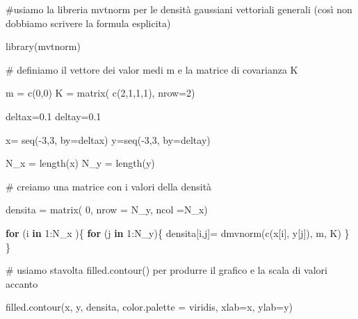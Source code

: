 \documentclass[
  italian,
  letterpaper,
]{book}
\newenvironment{Shaded}{\begin{snugshade}}{\end{snugshade}}
\newcommand{\AttributeTok}[1]{\textcolor[rgb]{0.40,0.45,0.13}{#1}}
\newcommand{\CommentTok}[1]{\textcolor[rgb]{0.37,0.37,0.37}{#1}}
\newcommand{\ControlFlowTok}[1]{\textcolor[rgb]{0.00,0.23,0.31}{\textbf{#1}}}
\newcommand{\DecValTok}[1]{\textcolor[rgb]{0.68,0.00,0.00}{#1}}
\newcommand{\FloatTok}[1]{\textcolor[rgb]{0.68,0.00,0.00}{#1}}
\newcommand{\FunctionTok}[1]{\textcolor[rgb]{0.28,0.35,0.67}{#1}}
\newcommand{\NormalTok}[1]{\textcolor[rgb]{0.00,0.23,0.31}{#1}}
\newcommand{\OtherTok}[1]{\textcolor[rgb]{0.00,0.23,0.31}{#1}}
\newcommand{\SpecialCharTok}[1]{\textcolor[rgb]{0.37,0.37,0.37}{#1}}
\newcommand{\StringTok}[1]{\textcolor[rgb]{0.13,0.47,0.30}{#1}}
\theoremstyle{definition}
\theoremstyle{remark}
\begin{document}
\begin{Shaded}
\begin{Highlighting}[]
\CommentTok{\#usiamo la libreria mvtnorm per le densità gaussiani vettoriali generali (così non dobbiamo scrivere la formula esplicita)}


\FunctionTok{library}\NormalTok{(}\StringTok{\textquotesingle{}mvtnorm\textquotesingle{}}\NormalTok{)}

\CommentTok{\# definiamo il vettore dei valor medi m e la matrice di covarianza K}

\NormalTok{m }\OtherTok{=} \FunctionTok{c}\NormalTok{(}\DecValTok{0}\NormalTok{,}\DecValTok{0}\NormalTok{)}
\NormalTok{K }\OtherTok{=} \FunctionTok{matrix}\NormalTok{( }\FunctionTok{c}\NormalTok{(}\DecValTok{2}\NormalTok{,}\DecValTok{1}\NormalTok{,}\DecValTok{1}\NormalTok{,}\DecValTok{1}\NormalTok{), }\AttributeTok{nrow=}\DecValTok{2}\NormalTok{)}



\NormalTok{deltax}\OtherTok{=}\FloatTok{0.1}
\NormalTok{deltay}\OtherTok{=}\FloatTok{0.1}

\NormalTok{x}\OtherTok{=} \FunctionTok{seq}\NormalTok{(}\SpecialCharTok{{-}}\DecValTok{3}\NormalTok{,}\DecValTok{3}\NormalTok{, }\AttributeTok{by=}\NormalTok{deltax)}
\NormalTok{y}\OtherTok{=}\FunctionTok{seq}\NormalTok{(}\SpecialCharTok{{-}}\DecValTok{3}\NormalTok{,}\DecValTok{3}\NormalTok{, }\AttributeTok{by=}\NormalTok{deltay)}

\NormalTok{N\_x }\OtherTok{=} \FunctionTok{length}\NormalTok{(x)}
\NormalTok{N\_y }\OtherTok{=} \FunctionTok{length}\NormalTok{(y)}


\CommentTok{\# creiamo una matrice con i valori della densità}

\NormalTok{densita }\OtherTok{=} \FunctionTok{matrix}\NormalTok{( }\DecValTok{0}\NormalTok{, }\AttributeTok{nrow =}\NormalTok{ N\_y, }\AttributeTok{ncol =}\NormalTok{N\_x)}

\ControlFlowTok{for}\NormalTok{ (i }\ControlFlowTok{in} \DecValTok{1}\SpecialCharTok{:}\NormalTok{N\_x  )\{}
  \ControlFlowTok{for}\NormalTok{ (j }\ControlFlowTok{in} \DecValTok{1}\SpecialCharTok{:}\NormalTok{N\_y)\{}
\NormalTok{    densita[i,j]}\OtherTok{=} \FunctionTok{dmvnorm}\NormalTok{(}\FunctionTok{c}\NormalTok{(x[i], y[j]), m, K)}
\NormalTok{  \}}
\NormalTok{\}}

\CommentTok{\# usiamo stavolta filled.contour() per produrre il grafico e la scala di valori accanto}

\FunctionTok{filled.contour}\NormalTok{(x, y, densita, }\AttributeTok{color.palette =}\NormalTok{ viridis, }\AttributeTok{xlab=}\StringTok{\textquotesingle{}x\textquotesingle{}}\NormalTok{, }\AttributeTok{ylab=}\StringTok{\textquotesingle{}y\textquotesingle{}}\NormalTok{)}
\end{Highlighting}
\end{Shaded}
\end{document}
